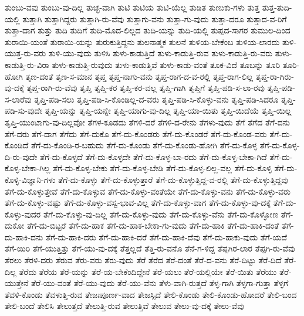{ತುಂಬು-ವವು
ತುಂಬು-ವು-ದಿಲ್ಲ
ತುಚ್ಛ-ವಾಗಿ
ತುಟಿ
ತುಟಿಯ
ತುಟಿ-ಯೆಲ್ಲ
ತುಡಿತ
ತುಣುಕು-ಗಳು
ತುತ್ತ
ತುತ್ತ-ತುದಿ-ಯಲ್ಲಿ
ತುತ್ತಾಗಿ
ತುತ್ತಾಗಿದ್ದರು
ತುತ್ತಾಗಿ-ರು-ವೆವು
ತುತ್ತಾಗು-ವನು
ತುತ್ತಾ-ಗು-ವುದು
ತುತ್ತಾ-ದರೂ
ತುತ್ತಾದ-ವ-ರಿಗೆ
ತುತ್ತಾ-ದಾಗ
ತುತ್ತು
ತುದಿ
ತುದಿಗೆ
ತುದಿ-ಮೊದ-ಲಿಲ್ಲದ
ತುದಿ-ಯನ್ನು
ತುದಿ-ಯಲ್ಲಿ
ತುಪ್ಪದ-ಸಾಗರ
ತುಮುಲ-ದಿಂದ
ತುರಾಯಿ-ಯಂತೆ
ತುರಾಯಿ-ಯನ್ನು
ತುರುಕುತ್ತಿದ್ದನು
ತುಲನಾತ್ಮಕ
ತುಲನೆ
ತುಳಿಯ-ಬೇಕೆಂಬ
ತುಳಿಯ-ಲಾರದು
ತುಳಿ-ಯುತ್ತ-ರು-ವರು
ತುಳಿ-ಯು-ವುದು
ತುಳಿಸಿ
ತುಳು-ಕಾಡುತ್ತಿದೆ
ತುಳು-ಕಾಡುತ್ತಿ-ರುವ
ತುಳು-ಕಾಡುತ್ತಿ-ರು-ವರು
ತುಳು-ಕಾಡುತ್ತಿ-ರು-ವಿರಾ
ತುಳು-ಕಾಡುತ್ತಿ-ರುವುದು
ತುಳು-ಕಾಡುತ್ತಿವೆ
ತುಳು-ಕಾಡು-ವಂತೆ
ತೂಕ-ವಿದೆ
ತೂಬನ್ನು
ತೂರಿ
ತೂರಿ-ಹೋಗಿ
ತೃಣ-ದಂತೆ
ತೃಣ-ಸ-ಮಾನ
ತೃಪ್ತ
ತೃಪ್ತ-ನಾಗು-ವನು
ತೃಪ್ತ-ರಾಗ-ದ-ವ-ರಲ್ಲಿ
ತೃಪ್ತ-ರಾಗ-ಲಿಲ್ಲ
ತೃಪ್ತ-ರಾ-ಗಿರು-ವು-ದಕ್ಕೆ
ತೃಪ್ತ-ರಾಗಿ-ರು-ವೆವು
ತೃಪ್ತಿ
ತೃಪ್ತಿ-ಕರ
ತೃಪ್ತಿ-ಕರ-ವಲ್ಲ
ತೃಪ್ತಿ-ಗಾಗಿ
ತೃಪ್ತಿಗೆ
ತೃಪ್ತಿ-ಪಡಿ-ಸ-ಲಾ-ರವು
ತೃಪ್ತಿ-ಪಡಿ-ಸ-ಲಾರೆವು
ತೃಪ್ತಿ-ಪಡಿ-ಸಲು
ತೃಪ್ತಿ-ಪಡಿ-ಸಿ-ಕೊಂಡಿಲ್ಲ-ದ-ವರು
ತೃಪ್ತಿ-ಪಡಿ-ಸಿ-ಕೊಳ್ಳು-ವನು
ತೃಪ್ತಿ-ಪಡಿ-ಸಿದರೂ
ತೃಪ್ತಿ-ಪಡಿ-ಸು-ವುದೇ
ತೃಪ್ತಿ-ಯನ್ನು
ತೃಪ್ತಿ-ಯನ್ನೇ
ತೃಪ್ತಿ-ಯಾಗು-ವು-ದಿಲ್ಲ
ತೃಪ್ತಿ-ಯಾ-ಯಿತು
ತೃಪ್ತಿ-ಯಿದೆಯೆ
ತೃಪ್ತಿ-ಯಿಲ್ಲ
ತೃಪ್ತಿ-ಯುಂಟಾಗು-ವು-ದಿಲ್ಲವೋ
ತೆಗಳ-ಕೂಡದು
ತೆಗಳಿ-ದರೆ
ತೆಗಳಿ-ದ-ರೇನು
ತೆಗಳು-ವುದು
ತೆಗೆ
ತೆಗೆದ
ತೆಗೆ-ದನು
ತೆಗೆ-ದರು
ತೆಗೆ-ದಾಗ
ತೆಗೆದು
ತೆಗೆ-ದುಕೊ
ತೆಗೆ-ದು-ಕೊಂಡರು
ತೆಗೆ-ದು-ಕೊಂಡರೆ
ತೆಗೆ-ದು-ಕೊಂಡ-ವರು
ತೆಗೆ-ದು-ಕೊಂಡಿದೆ
ತೆಗೆ-ದು-ಕೊಂಡಿ-ರ-ಬಹುದು
ತೆಗೆ-ದು-ಕೊಂಡು
ತೆಗೆ-ದು-ಕೊಂಡು-ಹೋಗಿ
ತೆಗೆ-ದು-ಕೊಳ್ಳ
ತೆಗೆ-ದು-ಕೊಳ್ಳ-ದಿ-ರು-ವುದೇ
ತೆಗೆ-ದು-ಕೊಳ್ಳದೆ
ತೆಗೆ-ದು-ಕೊಳ್ಳದೇ
ತೆಗೆ-ದು-ಕೊಳ್ಳ-ಬಾ-ರದು
ತೆಗೆ-ದು-ಕೊಳ್ಳ-ಬೇಕಾ-ಗಿದೆ
ತೆಗೆ-ದು-ಕೊಳ್ಳ-ಬೇಕಾ-ಗಿಲ್ಲ
ತೆಗೆ-ದು-ಕೊಳ್ಳ-ಬೇಕು
ತೆಗೆ-ದು-ಕೊಳ್ಳ-ಬೇಡಿ
ತೆಗೆ-ದು-ಕೊಳ್ಳ-ಲಿಲ್ಲ-ವಲ್ಲ
ತೆಗೆ-ದು-ಕೊಳ್ಳಿ
ತೆಗೆ-ದು-ಕೊಳ್ಳಿ-ವಿಜ್ಞಾನಿ-ಗಳು
ತೆಗೆ-ದು-ಕೊಳ್ಳು
ತೆಗೆ-ದು-ಕೊಳ್ಳುತ್ತಾರೆ
ತೆಗೆ-ದು-ಕೊಳ್ಳುತ್ತಿದ್ದ-ವ-ರಲ್ಲಿ
ತೆಗೆ-ದು-ಕೊಳ್ಳುತ್ತಿದ್ದವು
ತೆಗೆ-ದು-ಕೊಳ್ಳುತ್ತೇವೆ
ತೆಗೆ-ದು-ಕೊಳ್ಳುವ
ತೆಗೆ-ದು-ಕೊಳ್ಳು-ವಂತೆಯೇ
ತೆಗೆ-ದು-ಕೊಳ್ಳು-ವನು
ತೆಗೆ-ದು-ಕೊಳ್ಳು-ವರು
ತೆಗೆ-ದು-ಕೊಳ್ಳು-ವಷ್ಟು
ತೆಗೆ-ದು-ಕೊಳ್ಳು-ವಸ್ವ-ಭಾವ-ವಿಲ್ಲ
ತೆಗೆ-ದು-ಕೊಳ್ಳು-ವಾಗ
ತೆಗೆ-ದು-ಕೊಳ್ಳು-ವು-ದಕ್ಕೆ
ತೆಗೆ-ದು-ಕೊಳ್ಳು-ವುದರ
ತೆಗೆ-ದು-ಕೊಳ್ಳು-ವು-ದಿಲ್ಲ
ತೆಗೆ-ದು-ಕೊಳ್ಳು-ವುದು
ತೆಗೆ-ದು-ಕೊಳ್ಳು-ವೆನು
ತೆಗೆ-ದು-ಕೊಳ್ಳೋಣ
ತೆಗೆ-ದುಕೋ
ತೆಗೆ-ದು-ಬಿಟ್ಟರೆ
ತೆಗೆ-ದು-ಹಾಕ
ತೆಗೆ-ದು-ಹಾಕ-ಬೇಕಾ-ಗು-ವುದು
ತೆಗೆ-ದು-ಹಾಕಿ
ತೆಗೆ-ದು-ಹಾಕಿ-ದಂತೆ
ತೆಗೆ-ದು-ಹಾಕಿ-ದನು
ತೆಗೆ-ದು-ಹಾಕಿ-ದರು
ತೆಗೆ-ದು-ಹಾಕಿ-ದರೆ
ತೆಗೆ-ದು-ಹಾಕಿ-ದೆವು
ತೆಗೆ-ದು-ಹಾಕು-ವುದು
ತೆಗೆ-ಯದೆ
ತೆಗೆ-ಯಿರಿ
ತೆಗೆ-ಯುತ್ತಿತ್ತು
ತೆಗೆ-ಯು-ವು-ದಕ್ಕೆ
ತೆತ್ತಲ್ಲದೆ
ತೆತ್ತಿ-ರು-ವನೊ
ತೆನೆ-ಗ-ಳಿದ್ದ
ತೆಪ್ಪಗಿರ-ಲಾರ
ತೆಪ್ಪಗಿ-ರು-ವೆವು
ತೆರಲು
ತೆರಳಿ-ದರು
ತೆರುವ
ತೆರು-ವರು
ತೆರು-ವುದು
ತೆರೆ
ತೆರೆದ
ತೆರೆ-ದಂತೆ
ತೆರೆ-ದ-ವನು
ತೆರೆ-ದಿಟ್ಟು
ತೆರೆ-ದಿದೆ
ತೆರೆ-ದಿಲ್ಲ
ತೆರೆದು
ತೆರೆಯ
ತೆರೆ-ಯನ್ನು
ತೆರೆ-ಯ-ಬೇಕೆಂದಿದ್ದೇನೆ
ತೆರೆ-ಯಲು
ತೆರೆ-ಯಲ್ಲಿಯೇ
ತೆರೆ-ಯಿತು
ತೆರೆಯು
ತೆರೆ-ಯುತ್ತೇನೆ
ತೆರೆ-ಯು-ವಂತೆ
ತೆರೆ-ಯು-ವುದು
ತೆರೆ-ಯು-ವೆನು
ತೆಳು-ವಾಗಿ-ರುತ್ತದೆ
ತೆಳ್ಳ-ಗಾಗಿ
ತೆಳ್ಳಗಾ-ಗುತ್ತಾ
ತೆಳ್ಳಗೆ
ತೆವಳಿ-ಕೊಂಡು
ತೆವಳುತ್ತಿ-ರುವ
ತೇಜಃಪೂರ್ಣ-ವಾದ
ತೇಜಸ್ಸಿದೆ
ತೇಲಿ-ಕೊಂಡು
ತೇಲಿ-ಕೊಂಡು-ಹೋದರೆ
ತೇಲಿ-ಬಂದ
ತೇಲಿ-ಬಂದೆ
ತೇಲಿಸಿ
ತೇಲುತ್ತದೆ
ತೇಲುತ್ತಿ-ರುವ
ತೇಲುತ್ತಿವೆ
ತೇಲುವ
ತೇಲು-ವು-ದಕ್ಕೆ
ತೇಲು-ವೆವು
}
